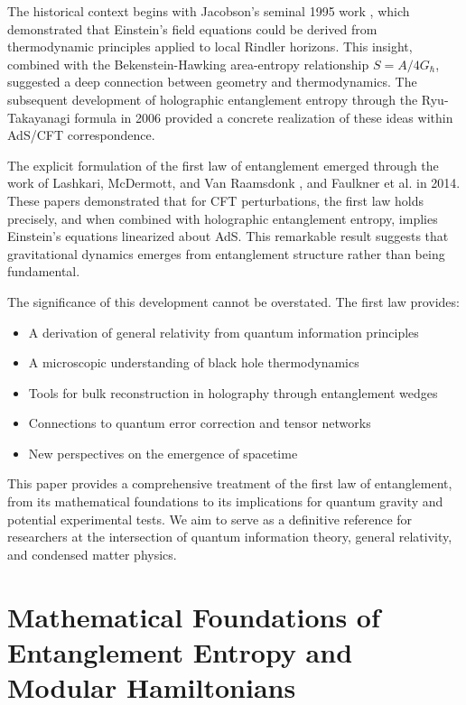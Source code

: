 \documentclass[11pt,letterpaper]{article}
\begin{document}
The historical context begins with Jacobson's seminal 1995 work \cite{Jacobson1995}, which demonstrated that Einstein's field equations could be derived from thermodynamic principles applied to local Rindler horizons. This insight, combined with the Bekenstein-Hawking area-entropy relationship $S = A/4G_\hbar$, suggested a deep connection between geometry and thermodynamics. The subsequent development of holographic entanglement entropy through the Ryu-Takayanagi formula \cite{Ryu2006} in 2006 provided a concrete realization of these ideas within AdS/CFT correspondence.

The explicit formulation of the first law of entanglement emerged through the work of Lashkari, McDermott, and Van Raamsdonk \cite{Lashkari2014}, and Faulkner et al. \cite{Faulkner2014} in 2014. These papers demonstrated that for CFT perturbations, the first law holds precisely, and when combined with holographic entanglement entropy, implies Einstein's equations linearized about AdS. This remarkable result suggests that gravitational dynamics emerges from entanglement structure rather than being fundamental.

The significance of this development cannot be overstated. The first law provides:
\begin{itemize}
\item A derivation of general relativity from quantum information principles
\item A microscopic understanding of black hole thermodynamics
\item Tools for bulk reconstruction in holography through entanglement wedges
\item Connections to quantum error correction and tensor networks
\item New perspectives on the emergence of spacetime
\end{itemize}

This paper provides a comprehensive treatment of the first law of entanglement, from its mathematical foundations to its implications for quantum gravity and potential experimental tests. We aim to serve as a definitive reference for researchers at the intersection of quantum information theory, general relativity, and condensed matter physics.

\section{Mathematical Foundations of Entanglement Entropy and Modular Hamiltonians}
\end{document}
